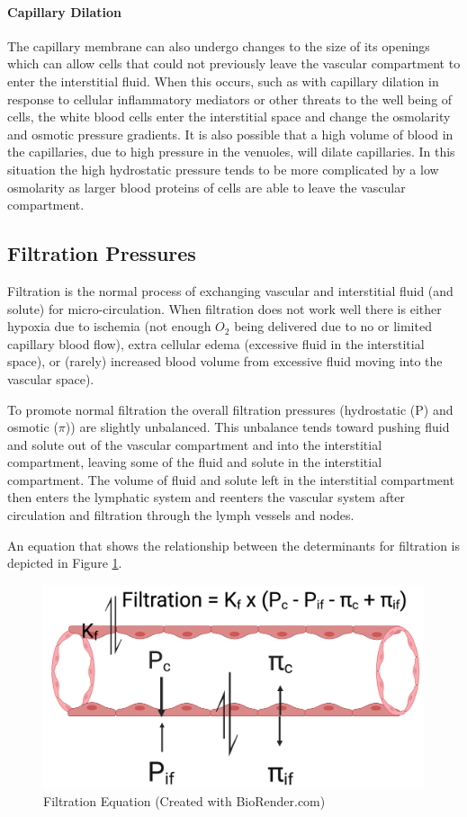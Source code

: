 \paragraph{Capillary Dilation}
The capillary membrane can also undergo changes to the size of its openings which can allow cells that could not previously leave the vascular compartment to enter the interstitial fluid. When this occurs, such as with capillary dilation in response to cellular inflammatory mediators or other threats to the well being of cells, the white blood cells enter the interstitial space and change the osmolarity and osmotic pressure gradients. It is also possible that a high volume of blood in the capillaries, due to high pressure in the venuoles, will dilate capillaries. In this situation the high hydrostatic pressure tends to be more complicated by a low osmolarity as larger blood proteins of cells are able to leave the vascular compartment.

\subsection{Filtration Pressures}

Filtration is the normal process of exchanging vascular and interstitial fluid (and solute) for micro-circulation. When filtration does not work well there is either hypoxia due to ischemia (not enough $O_2$ being delivered due to no or limited capillary blood flow), extra cellular edema (excessive fluid in the interstitial space), or (rarely) increased blood volume from excessive fluid moving into the vascular space).

To promote normal filtration the overall filtration pressures (hydrostatic (P) and osmotic ($\pi$)) are slightly unbalanced. This unbalance tends toward pushing fluid and solute out of the vascular compartment and into the interstitial compartment, leaving some of the fluid and solute in the interstitial compartment. The volume of fluid and solute left in the interstitial compartment then enters the lymphatic system and reenters the vascular system after circulation and filtration through the lymph vessels and nodes. 

An equation that shows the relationship between the determinants for filtration is depicted in Figure \ref{fig:filtration_equation}. 

\begin{figure}[!h]
    \centering
    \includegraphics[width=0.7\linewidth]{./figure/filtration_equation.png}
    \caption{Filtration Equation \footnotesize{(Created with BioRender.com)}}
    \label{fig:filtration_equation}
\end{figure}

